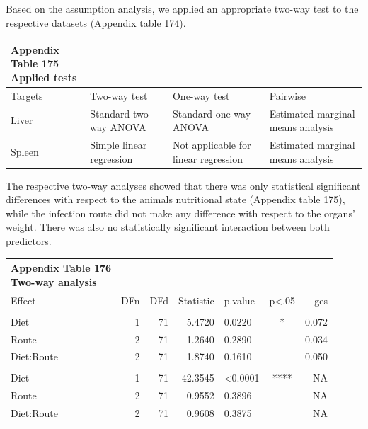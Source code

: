 \documentclass[
  12pt,
  letterpaper,
]{article}
\begin{document}
Based on the assumption analysis, we applied an appropriate two-way test to the respective datasets (Appendix table 174).

\begingroup
\fontsize{12.0pt}{14.4pt}\selectfont
\begin{longtable}{l|lll}
\caption*{
{\large \textbf{Appendix Table 175}} \\ 
{\small \textbf{Applied tests}}
} \\ 
\toprule
Targets & {Two-way test} & {One-way test} & {Pairwise} \\ 
\midrule\addlinespace[2.5pt]
Liver & Standard two-way ANOVA & Standard one-way ANOVA & Estimated marginal means analysis \\ 
Spleen & Simple linear regression & Not applicable for linear regression & Estimated marginal means analysis \\ 
\bottomrule
\end{longtable}
\endgroup

The respective two-way analyses showed that there was only statistical significant differences with respect to the animals nutritional state (Appendix table 175), while the infection route did not make any difference with respect to the organs' weight. There was also no statistically significant interaction between both predictors.

\begingroup
\fontsize{12.0pt}{14.4pt}\selectfont
\begin{longtable}{lrrrlcr}
\caption*{
{\large \textbf{Appendix Table 176}} \\ 
{\small \textbf{Two-way analysis}}
} \\ 
\toprule
{Effect} & {DFn} & {DFd} & {Statistic} & {p.value} & {p<.05} & {ges} \\ 
\midrule\addlinespace[2.5pt]
\multicolumn{7}{l}{Liver} \\[2.5pt] 
\midrule\addlinespace[2.5pt]
Diet & 1 & 71 & 5.4720 & 0.0220 & * & 0.072 \\ 
Route & 2 & 71 & 1.2640 & 0.2890 &  & 0.034 \\ 
Diet:Route & 2 & 71 & 1.8740 & 0.1610 &  & 0.050 \\ 
\midrule\addlinespace[2.5pt]
\multicolumn{7}{l}{Spleen} \\[2.5pt] 
\midrule\addlinespace[2.5pt]
Diet & 1 & 71 & 42.3545 & <0.0001 & **** & NA \\ 
Route & 2 & 71 & 0.9552 & 0.3896 &   & NA \\ 
Diet:Route & 2 & 71 & 0.9608 & 0.3875 &   & NA \\ 
\bottomrule
\end{longtable}
\endgroup
\end{document}
